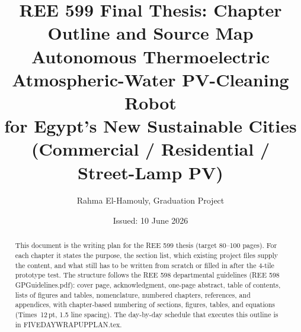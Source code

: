 \documentclass[11pt,a4paper]{article}
\title{\textbf{REE 599 Final Thesis: Chapter Outline and Source Map}\\[0.4em]
\large Autonomous Thermoelectric Atmospheric-Water PV-Cleaning Robot\\[0.2em]
\normalsize for Egypt's New Sustainable Cities (Commercial / Residential / Street-Lamp PV)}
\author{Rahma El-Hamouly, Graduation Project}
\date{Issued: 10 June 2026}
\newcommand{\f}[1]{{\ttfamily\def\_{\textunderscore\allowbreak}#1}}
\begin{document}
\maketitle

\begin{abstract}
\noindent
This document is the writing plan for the REE 599 thesis (target 80--100 pages).
For each chapter it states the purpose, the section list, which existing project
files supply the content, and what still has to be written from scratch or
filled in after the 4-tile prototype test. The structure follows the REE 598
departmental guidelines (\f{REE 598 GP\_1\_Guidelines.pdf}): cover page,
acknowledgment, one-page abstract, table of contents, lists of figures and
tables, nomenclature, numbered chapters, references, and appendices, with
chapter-based numbering of sections, figures, tables, and equations
(Times~12\,pt, 1.5 line spacing). The day-by-day schedule that executes this
outline is in \f{FIVE\_DAY\_WRAPUP\_PLAN.tex}.
\end{abstract}

\tableofcontents
\newpage

\end{document}
